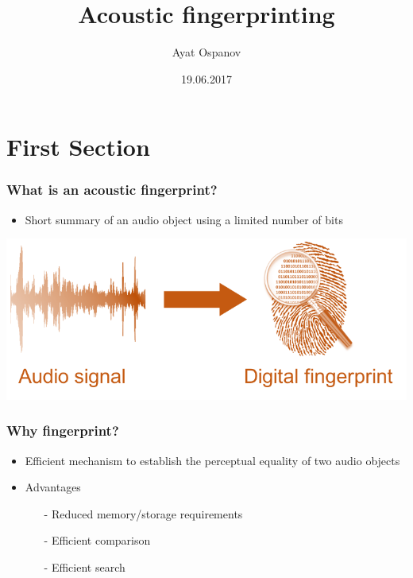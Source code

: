 \documentclass{beamer}
\title[Acoustic fingerprinting]{Acoustic fingerprinting}
\author{Ayat Ospanov}
\institute[]
{
517th group \\
MMP, CMC, Lomonosov MSU \\
Moscow, Russia
}
\date{19.06.2017}
\begin{document}
\begin{frame}
\titlepage %
\end{frame}


\section{First Section}



\begin{frame}
\frametitle{What is an acoustic fingerprint?}
\begin{itemize}
    \item Short summary of an audio object using a limited number of bits
\end{itemize}
\begin{center}
    \includegraphics[width=0.8\linewidth]{pics/fingerprint}
\end{center}
\end{frame}


\begin{frame}
\frametitle{Why fingerprint?}
\begin{itemize}
    \item Efficient mechanism to establish the perceptual equality of two audio objects
    \item Advantages
    \begin{itemize}
        \item[-] Reduced memory/storage requirements
        \item[-] Efficient comparison
        \item[-] Efficient search
    \end{itemize}
\end{itemize}
\end{frame}
\end{document}
